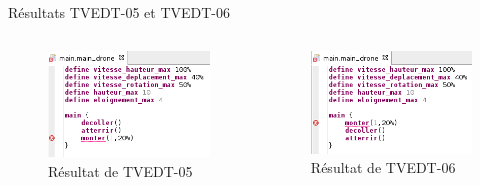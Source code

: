 \documentclass{bredelebeamer}
\begin{document}
\begin{frame}{Résultats TVEDT-05 et TVEDT-06} 
\begin{columns}
\begin{column}{0.5\textwidth}
\begin{figure}
\centering
\includegraphics[scale=0.4]{images/TVEDT-05.png}
\caption{Résultat de TVEDT-05}
\end{figure}
\end{column}
\begin{column}{0.5\textwidth}
\begin{figure}
\centering
\includegraphics[scale=0.4]{images/TVEDT-06.png}
\caption{Résultat de TVEDT-06}
\end{figure}
\end{column}
\end{columns}
\end{frame}
\end{document}
